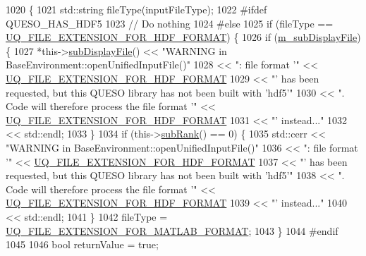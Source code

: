 \begin{DoxyCode}
1020 \{
1021   std::string fileType(inputFileType);
1022 \textcolor{preprocessor}{#ifdef QUESO\_HAS\_HDF5}
1023 \textcolor{preprocessor}{}  \textcolor{comment}{// Do nothing}
1024 \textcolor{preprocessor}{#else}
1025 \textcolor{preprocessor}{}  \textcolor{keywordflow}{if} (fileType == \hyperlink{_defines_8h_a4ebcc075277d031eb97c90b9a45f4493}{UQ\_FILE\_EXTENSION\_FOR\_HDF\_FORMAT}) \{
1026     \textcolor{keywordflow}{if} (\hyperlink{class_q_u_e_s_o_1_1_base_environment_a52b4275aa8ee85994dd304d9fe95c9c5}{m\_subDisplayFile}) \{
1027       *this->\hyperlink{class_q_u_e_s_o_1_1_base_environment_a8a0064746ae8dddfece4229b9ad374d6}{subDisplayFile}() << \textcolor{stringliteral}{"WARNING in BaseEnvironment::openUnifiedInputFile()"}
1028                               << \textcolor{stringliteral}{": file format '"} << 
      \hyperlink{_defines_8h_a4ebcc075277d031eb97c90b9a45f4493}{UQ\_FILE\_EXTENSION\_FOR\_HDF\_FORMAT}
1029                               << \textcolor{stringliteral}{"' has been requested, but this QUESO library has not been built with
       'hdf5'"}
1030                               << \textcolor{stringliteral}{". Code will therefore process the file format '"} << 
      \hyperlink{_defines_8h_a4ebcc075277d031eb97c90b9a45f4493}{UQ\_FILE\_EXTENSION\_FOR\_HDF\_FORMAT}
1031                               << \textcolor{stringliteral}{"' instead..."}
1032                               << std::endl;
1033     \}
1034     \textcolor{keywordflow}{if} (this->\hyperlink{class_q_u_e_s_o_1_1_base_environment_a172d52f993f1322ed45aaddf71518dbb}{subRank}() == 0) \{
1035       std::cerr << \textcolor{stringliteral}{"WARNING in BaseEnvironment::openUnifiedInputFile()"}
1036                 << \textcolor{stringliteral}{": file format '"} << \hyperlink{_defines_8h_a4ebcc075277d031eb97c90b9a45f4493}{UQ\_FILE\_EXTENSION\_FOR\_HDF\_FORMAT}
1037                 << \textcolor{stringliteral}{"' has been requested, but this QUESO library has not been built with 'hdf5'"}
1038                 << \textcolor{stringliteral}{". Code will therefore process the file format '"} << 
      \hyperlink{_defines_8h_a4ebcc075277d031eb97c90b9a45f4493}{UQ\_FILE\_EXTENSION\_FOR\_HDF\_FORMAT}
1039                 << \textcolor{stringliteral}{"' instead..."}
1040                 << std::endl;
1041     \}
1042     fileType = \hyperlink{_defines_8h_ac440026eff7deb1c1eed1eea0e8e36ba}{UQ\_FILE\_EXTENSION\_FOR\_MATLAB\_FORMAT};
1043   \}
1044 \textcolor{preprocessor}{#endif}
1045 \textcolor{preprocessor}{}
1046   \textcolor{keywordtype}{bool} returnValue = \textcolor{keyword}{true};

\end{DoxyCode}
